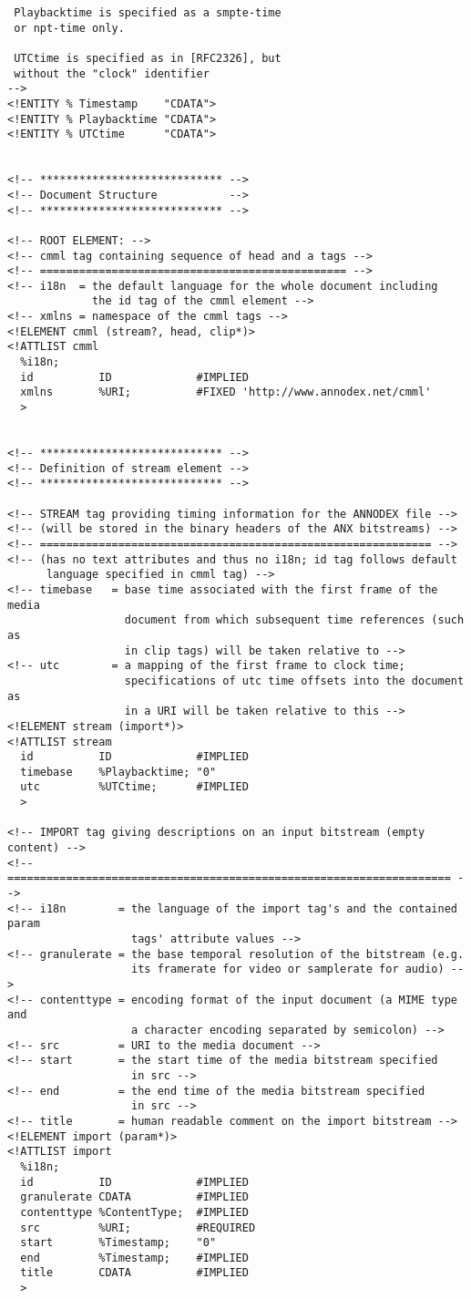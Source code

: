 \begin{verbatim}
 Playbacktime is specified as a smpte-time 
 or npt-time only.

 UTCtime is specified as in [RFC2326], but
 without the "clock" identifier
-->
<!ENTITY % Timestamp    "CDATA">
<!ENTITY % Playbacktime "CDATA">
<!ENTITY % UTCtime      "CDATA">


<!-- **************************** -->
<!-- Document Structure           -->
<!-- **************************** -->

<!-- ROOT ELEMENT: -->
<!-- cmml tag containing sequence of head and a tags -->
<!-- =============================================== -->
<!-- i18n  = the default language for the whole document including
             the id tag of the cmml element -->
<!-- xmlns = namespace of the cmml tags -->
<!ELEMENT cmml (stream?, head, clip*)>
<!ATTLIST cmml
  %i18n;
  id          ID             #IMPLIED
  xmlns       %URI;          #FIXED 'http://www.annodex.net/cmml'
  >


<!-- **************************** -->
<!-- Definition of stream element -->
<!-- **************************** -->

<!-- STREAM tag providing timing information for the ANNODEX file -->
<!-- (will be stored in the binary headers of the ANX bitstreams) -->
<!-- ============================================================ -->
<!-- (has no text attributes and thus no i18n; id tag follows default 
      language specified in cmml tag) -->
<!-- timebase   = base time associated with the first frame of the media 
                  document from which subsequent time references (such as 
                  in clip tags) will be taken relative to -->
<!-- utc        = a mapping of the first frame to clock time; 
                  specifications of utc time offsets into the document as
                  in a URI will be taken relative to this -->
<!ELEMENT stream (import*)>
<!ATTLIST stream
  id          ID             #IMPLIED
  timebase    %Playbacktime; "0"
  utc         %UTCtime;      #IMPLIED
  >

<!-- IMPORT tag giving descriptions on an input bitstream (empty content) -->
<!-- ==================================================================== -->
<!-- i18n        = the language of the import tag's and the contained param
                   tags' attribute values -->
<!-- granulerate = the base temporal resolution of the bitstream (e.g.
                   its framerate for video or samplerate for audio) -->
<!-- contenttype = encoding format of the input document (a MIME type and
                   a character encoding separated by semicolon) -->
<!-- src         = URI to the media document -->
<!-- start       = the start time of the media bitstream specified
                   in src -->
<!-- end         = the end time of the media bitstream specified
                   in src -->
<!-- title       = human readable comment on the import bitstream -->
<!ELEMENT import (param*)>
<!ATTLIST import 
  %i18n;
  id          ID             #IMPLIED
  granulerate CDATA          #IMPLIED
  contenttype %ContentType;  #IMPLIED
  src         %URI;          #REQUIRED
  start       %Timestamp;    "0"
  end         %Timestamp;    #IMPLIED
  title       CDATA          #IMPLIED
  >


\end{verbatim}
